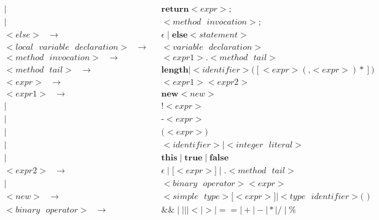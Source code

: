 \documentclass[a4paper,12pt]{article}
\newcommand{\bb}[1]{\textbf{#1}}
\newcommand{\s}{\text{ }}
\begin{document}
\begin{align*}
             \mid \s &\bb{return} <expr> \bb{;}  \\
             \mid \s &<method\s invocation> \bb{;} \\
<else>\s \to \s &\epsilon \mid \bb{else} <statement> \\
<local\s variable\s declaration> \s \to \s &<variable\s declaration> \\
<method\s invocation>\s \to \s &<expr1> \bb{.} <method\s tail>  \\
<method\s tail>\s \to \s &\bb{length} \mid <identifier> \bb{(} [ <expr> (\bb{,} <expr>)* ] \bb{)} \\
\hline
<expr>\s \to \s &<expr1><expr2> \\
<expr1>\s \to \s &\bb{new} <new>\\
    \mid \s    &\bb{!} <expr> \\
    \mid \s    &\bb{-} <expr> \\
    \mid \s    &\bb{(} <expr> \bb{)} \\
    \mid \s    &<identifier> \mid <integer\s literal> \\
    \mid \s    &\bb{this} \mid \bb{true} \mid \bb{false} \\
<expr2>\s \to \s &\epsilon \mid \bb{[} <expr> \bb{]} \mid \bb{.}<method\s tail>\\
    \mid \s    &<binary\s operator> <expr> \\
<new>\s \to \s &<simple\s type> \bb{[} <expr> \bb{]} \mid <type\s identifier> \bb{( )} \\ 
<binary\s operator>\s \to \s & \&\& \mid || \mid < \mid > \mid == \mid + \mid - \mid * \mid / \mid \% 
\end{align*}
\endgroup
\end{document}

